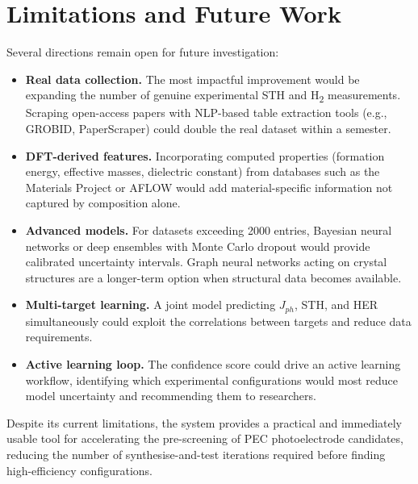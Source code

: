 \section{Limitations and Future Work}

Several directions remain open for future investigation:

\begin{itemize}
  \item \textbf{Real data collection.}
        The most impactful improvement would be expanding the number of
        genuine experimental STH and H\textsubscript{2} measurements.
        Scraping open-access papers with NLP-based table extraction tools
        (e.g., GROBID, PaperScraper) could double the real dataset within
        a semester.

  \item \textbf{DFT-derived features.}
        Incorporating computed properties (formation energy, effective masses,
        dielectric constant) from databases such as the Materials Project
        \cite{jain2013commentary} or AFLOW \cite{curtarolo2012aflow} would
        add material-specific information not captured by composition alone.

  \item \textbf{Advanced models.}
        For datasets exceeding 2000 entries, Bayesian neural networks or
        deep ensembles with Monte Carlo dropout would provide calibrated
        uncertainty intervals.
        Graph neural networks acting on crystal structures are a longer-term
        option when structural data becomes available.

  \item \textbf{Multi-target learning.}
        A joint model predicting $J_{ph}$, STH, and HER simultaneously
        could exploit the correlations between targets and reduce
        data requirements.

  \item \textbf{Active learning loop.}
        The confidence score could drive an active learning workflow,
        identifying which experimental configurations would most reduce
        model uncertainty and recommending them to researchers.
\end{itemize}

Despite its current limitations, the system provides a practical and
immediately usable tool for accelerating the pre-screening of PEC
photoelectrode candidates, reducing the number of synthesise-and-test
iterations required before finding high-efficiency configurations.
